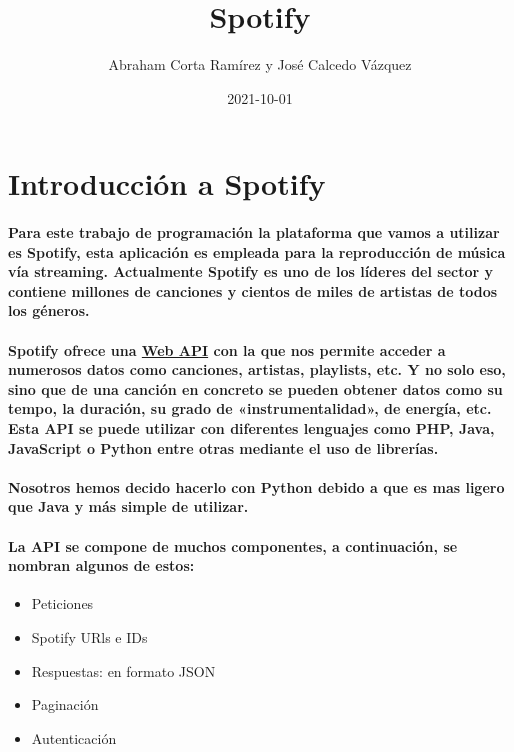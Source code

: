 \documentclass[11pt,spanish]{article}
\title{Spotify}
\date{2021-10-01}
\author{Abraham Corta Ramírez y José Calcedo Vázquez}
\begin{document}
\maketitle
\newpage
{}

\tableofcontents

\listoffigures

\clearpage

\section{Introducción a Spotify}

\paragraph*{Para este trabajo de programación la plataforma que vamos a utilizar es Spotify, esta aplicación es empleada para la reproducción de música vía streaming. Actualmente Spotify es uno de los líderes del sector y contiene millones de canciones y cientos de miles de artistas de todos los géneros.}

\paragraph*{Spotify ofrece una \href{https://developer.spotify.com/documentation/web-api/}{Web API} con la que nos permite acceder a numerosos datos como canciones, artistas, playlists, etc. Y no solo eso, sino que de una canción en concreto se pueden obtener datos como su tempo, la duración, su grado de «instrumentalidad», de energía, etc. Esta API se puede utilizar con diferentes lenguajes como PHP, Java, JavaScript o Python entre otras mediante el uso de librerías.}

\paragraph*{Nosotros hemos decido hacerlo con Python debido a que es mas ligero que Java y más simple de utilizar.}

\paragraph*{La API se compone de muchos componentes, a continuación, se nombran algunos de estos:}

\begin{itemize}
	\item Peticiones
	\item Spotify URls e IDs 
	\item Respuestas: en formato JSON
	\item Paginación
	\item Autenticación 
\end{itemize}
\end{document}
